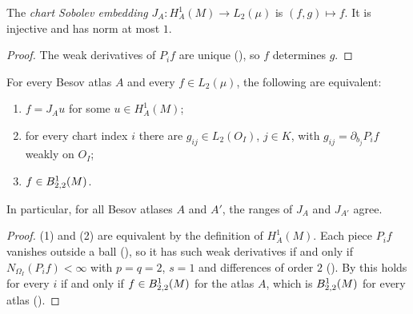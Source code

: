 \begin{definition}
\label{def:chart-sobolev-embedding}
\leanok
{}
The \emph{chart Sobolev embedding} $J_A \colon H^1_A(M) \to L_2(\mu)$ is $(f, g) \mapsto f$. It is
injective and has norm at most $1$.
\end{definition}

\begin{proof}
\leanok
The weak derivatives of $P_i f$ are unique (), so $f$ determines
$g$.
\end{proof}

\begin{theorem}[$H^1_A(M) = B^1_{2,2}(M)$]
\label{thm:chart-sobolev-besov}
\leanok
{}
For every Besov atlas $A$ and every $f \in L_2(\mu)$, the following are equivalent:
\begin{enumerate}
  \item $f = J_A u$ for some $u \in H^1_A(M)$;
  \item for every chart index $i$ there are $g_{ij} \in L_2(O_I)$, $j \in K$, with
    $g_{ij} = \partial_{b_j} P_i f$ weakly on $O_I$;
  \item $f \in B^{1}_{2,2}(M)$.
\end{enumerate}
In particular, for all Besov atlases $A$ and $A'$, the ranges of $J_A$ and $J_{A'}$ agree.
\end{theorem}

\begin{proof}
\leanok
(1) and (2) are equivalent by the definition of $H^1_A(M)$. Each piece $P_i f$ vanishes outside a
ball (), so it has such weak derivatives if and only if
$N_{\Omega_I}(P_i f) < \infty$ with $p = q = 2$, $s = 1$ and differences of order $2$
(). By  this holds for every
$i$ if and only if $f \in B^{1}_{2,2}(M)$ for the atlas $A$, which is
$B^{1}_{2,2}(M)$ for every atlas ().
\end{proof}

